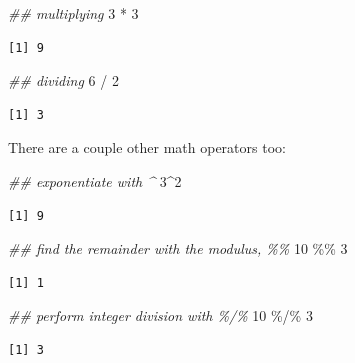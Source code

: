 \documentclass[
  letterpaper,
  DIV=11,
  numbers=noendperiod]{scrreprt}
\newenvironment{Shaded}{\begin{snugshade}}{\end{snugshade}}
\newcommand{\DecValTok}[1]{\textcolor[rgb]{0.68,0.00,0.00}{#1}}
\newcommand{\DocumentationTok}[1]{\textcolor[rgb]{0.37,0.37,0.37}{\textit{#1}}}
\newcommand{\SpecialCharTok}[1]{\textcolor[rgb]{0.37,0.37,0.37}{#1}}
\begin{document}
\begin{Shaded}
\begin{Highlighting}[]
\DocumentationTok{\#\# multiplying}
\DecValTok{3} \SpecialCharTok{*} \DecValTok{3}
\end{Highlighting}
\end{Shaded}

\begin{verbatim}
[1] 9
\end{verbatim}

\begin{Shaded}
\begin{Highlighting}[]
\DocumentationTok{\#\# dividing}
\DecValTok{6} \SpecialCharTok{/} \DecValTok{2}
\end{Highlighting}
\end{Shaded}

\begin{verbatim}
[1] 3
\end{verbatim}

There are a couple other math operators too:

\begin{Shaded}
\begin{Highlighting}[]
\DocumentationTok{\#\# exponentiate with \^{}}
\DecValTok{3}\SpecialCharTok{\^{}}\DecValTok{2}
\end{Highlighting}
\end{Shaded}

\begin{verbatim}
[1] 9
\end{verbatim}

\begin{Shaded}
\begin{Highlighting}[]
\DocumentationTok{\#\# find the remainder with the modulus, \%\%}
\DecValTok{10} \SpecialCharTok{\%\%} \DecValTok{3}
\end{Highlighting}
\end{Shaded}

\begin{verbatim}
[1] 1
\end{verbatim}

\begin{Shaded}
\begin{Highlighting}[]
\DocumentationTok{\#\# perform integer division with \%/\%}
\DecValTok{10} \SpecialCharTok{\%/\%} \DecValTok{3}
\end{Highlighting}
\end{Shaded}

\begin{verbatim}
[1] 3
\end{verbatim}
\end{document}
